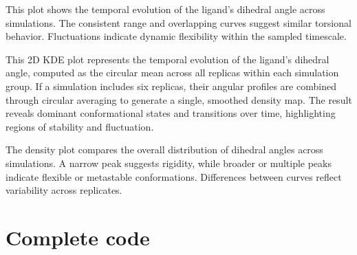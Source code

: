 \documentclass[a4paper,10pt,english]{sphinxmanual}
\let\sphinxpxdimen\pdfpxdimen\else\newdimen\sphinxpxdimen
\begin{document}
\noindent{}

\sphinxAtStartPar
{} This plot shows the temporal evolution of the ligand’s dihedral angle across simulations. The consistent range and overlapping curves suggest similar torsional behavior. Fluctuations indicate dynamic flexibility within the sampled timescale.

\noindent{}

\sphinxAtStartPar
{} This 2D KDE plot represents the temporal evolution of the ligand’s dihedral angle, computed as the circular mean across all replicas within each simulation group. If a simulation includes six replicas, their angular profiles are combined through circular averaging to generate a single, smoothed density map. The result reveals dominant conformational states and transitions over time, highlighting regions of stability and fluctuation.

\noindent{\hspace*{\fill}\sphinxincludegraphics[width=500\sphinxpxdimen]{{ligand_angle_density}.png}\hspace*{\fill}}

\sphinxAtStartPar
{} The density plot compares the overall distribution of dihedral angles across simulations. A narrow peak suggests rigidity, while broader or multiple peaks indicate flexible or metastable conformations. Differences between curves reflect variability across replicates.


\section{Complete code}
\label{\detokenize{Ligand angle:complete-code}}
\begin{sphinxVerbatim}[commandchars=\\\{\}]
 
\end{sphinxVerbatim}

\begin{sphinxVerbatim}[commandchars=\\\{\}]
\end{sphinxVerbatim}
\end{document}
